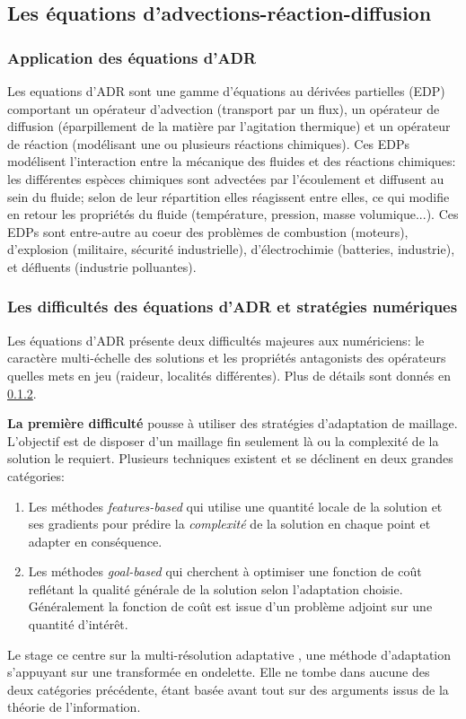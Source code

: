 \subsection{Les équations d'advections-réaction-diffusion}
    \subsubsection{Application des équations d'ADR}
    Les equations d'ADR sont une gamme d'équations au dérivées partielles (EDP) comportant un opérateur d'advection (transport par un flux),
    un opérateur de diffusion (éparpillement de la matière par l'agitation thermique) et un opérateur de réaction (modélisant une ou plusieurs réactions chimiques).
    Ces EDPs modélisent l'interaction entre la mécanique des fluides et des réactions chimiques: les différentes espèces chimiques sont advectées par l'écoulement et diffusent au sein du fluide;
    selon de leur répartition elles réagissent entre elles, ce qui modifie en retour les propriétés du fluide (température, pression, masse volumique...). 
    Ces EDPs sont entre-autre au coeur des problèmes de combustion (moteurs), d'explosion (militaire, sécurité industrielle), d’électrochimie (batteries, industrie), 
    et défluents (industrie polluantes).
    \subsubsection{Les difficultés des équations d'ADR et stratégies numériques}
    Les équations d'ADR présente deux difficultés majeures aux numériciens: le caractère multi-échelle des solutions et les propriétés antagonists des opérateurs quelles mets en jeu
    (raideur, localités différentes). Plus de détails sont donnés en \ref{}.\par

    \textbf{La première difficulté} pousse à utiliser des stratégies d'adaptation de maillage. L'objectif est de disposer d'un maillage fin seulement là ou la complexité de la solution le requiert.
    Plusieurs techniques existent et se déclinent en deux grandes catégories\cite{Vivarelli2025Fluids}:
    \begin{enumerate}
        \item Les méthodes \textit{features-based} qui utilise une quantité locale de la solution et ses gradients pour prédire la \textit{complexité} de la solution en chaque point 
        et adapter en conséquence.
        \item Les méthodes \textit{goal-based} qui cherchent à optimiser une fonction de coût reflétant la qualité générale de la solution selon l'adaptation choisie.
        Généralement la fonction de coût est issue d'un problème adjoint sur une quantité d’intérêt.
    \end{enumerate}
    Le stage ce centre sur la multi-résolution adaptative \cite{harten1994}, une méthode d'adaptation s'appuyant sur une transformée en ondelette.
    Elle ne tombe dans aucune des deux catégories précédente, étant basée avant tout sur des arguments issus de la théorie de l'information.\par


